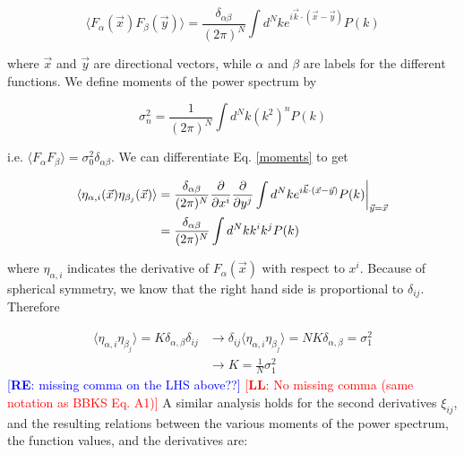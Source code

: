 \documentclass[12pt]{article}
\newcommand{\re}[1]{\textcolor{blue}{[{\bf RE}: #1]}}
\newcommand{\lfl}[1]{\textcolor{red}{[{\bf LL}: #1]}}
\begin{document}
\begin{equation}
\langle F_\alpha(\vec{x}) F_\beta(\vec{y}) \rangle = \frac{\delta_{\alpha\beta}}{(2\pi)^N} \int d^Nk e^{i \vec{k} \cdot (\vec{x}-\vec{y})} P(k)
\end{equation}

\noindent where $\vec{x}$ and $\vec{y}$ are directional vectors, while $\alpha$ and $\beta$ are labels for the different functions. We define moments of the power spectrum by

\begin{equation} \label{moments}
\sigma_n^2 = \frac{1}{(2\pi)^N}\int d^Nk (k^{2})^n P(k)
\end{equation}

\noindent i.e. $\langle F_\alpha F_\beta \rangle = \sigma_0^2\delta_{\alpha\beta}$. We can differentiate Eq. \ref{moments} to get

\begin{align*}
\langle \eta_{\alpha,i}(\vec{x})\eta_{\beta_j}(\vec{x})\rangle &= \frac{\delta_{\alpha\beta}}{(2\pi)^N} \frac{\partial}{\partial x^i}\frac{\partial}{\partial y^j} \int d^Nk e^{i \vec{k} \cdot (\vec{x}-\vec{y})} P(k)\bigg{|}_{\vec{y}=\vec{x}}\\
&= \frac{\delta_{\alpha\beta}}{(2\pi)^N}\int d^Nk k^i k^j P(k)
\end{align*}

\noindent where $\eta_{\alpha, i}$ indicates the derivative of $F_\alpha(\vec{x})$ with respect to $x^i$. Because of spherical symmetry, we know that the right hand side is proportional to $\delta_{ij}$. Therefore

\begin{align*}
\langle \eta_{\alpha,i}\eta_{\beta_j}\rangle = K \delta_{\alpha,\beta}\delta_{ij} &\rightarrow \delta_{ij}\langle \eta_{\alpha,i}\eta_{\beta_j}\rangle = NK \delta_{\alpha,\beta}=\sigma_1^2\\
&\rightarrow K = \frac{1}{N}\sigma_1^2
\end{align*}
%
\re{missing comma on the LHS above??} \lfl{No missing comma (same notation as BBKS Eq. A1)} A similar analysis holds for the second derivatives $\xi_{ij}$, and the resulting relations between the various moments of the power spectrum, the function values, and the derivatives are:

\end{document}

